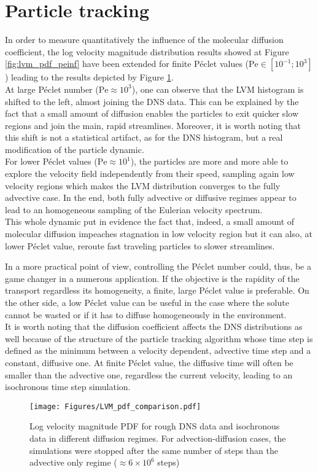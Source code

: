 \section{Particle tracking}
In order to measure quantitatively the influence of the molecular diffusion coefficient, the log velocity magnitude distribution results showed at Figure \ref{fig:lvm_pdf_peinf} have been extended for finite Péclet values ($\mathrm{Pe}\in[10^{-1};10^3]$) leading to the results depicted by Figure \ref{fig:lvm_pdf_pe}.\\
At large Péclet number ($\mathrm{Pe}\approx 10^3$), one can observe that the LVM histogram is shifted to the left, almost joining the DNS data. 
This can be explained by the fact that a small amount of diffusion enables the particles to exit quicker slow regions and join the main, rapid streamlines.
Moreover, it is worth noting that this shift is not a statistical artifact, as for the DNS histogram, but a real modification of the particle dynamic.\\
For lower Péclet values ($\mathrm{Pe}\approx10^1$), the particles are more and more able to explore the velocity field independently from their speed, sampling again low velocity regions which makes the LVM distribution converges to the fully advective case.
In the end, both fully advective or diffusive regimes appear to lead to an homogeneous sampling of the Eulerian velocity spectrum.\\
This whole dynamic put in evidence the fact that, indeed, a small amount of molecular diffusion impeaches stagnation in low velocity region but it can also, at lower Péclet value, reroute fast traveling particles to slower streamlines.

In a more practical point of view, controlling the Péclet number could, thus, be a game changer in a numerous application. If the objective is the rapidity of the transport regardless its homogeneity, a finite, large Péclet value is preferable. On the other side, a low Péclet value can be useful in the case where the solute cannot be wasted or if it has to diffuse homogeneously in the environment.\\

It is worth noting that the diffusion coefficient affects the DNS distributions as well because of the structure of the particle tracking algorithm whose time step is defined as the minimum between a velocity dependent, advective time step and a constant, diffusive one.
At finite Péclet value, the diffusive time will often be smaller than the advective one, regardless the current velocity, leading to an isochronous time step simulation.\\
\begin{figure}[h!]
	\centering
	\texttt{[image: Figures/LVM\_pdf\_comparison.pdf]}
	\caption{Log velocity magnitude PDF for rough DNS data and isochronous data in different diffusion regimes. For advection-diffusion cases, the simulations were stopped after the same number of steps than the advective only regime ($\approx6\times 10^6$ steps) }
	\label{fig:lvm_pdf_pe}
\end{figure}
